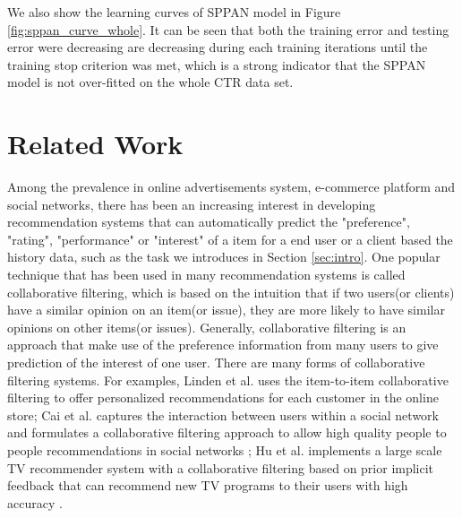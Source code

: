 \documentclass[conference,compsoc]{IEEEtran}
\begin{document}
We also show the learning curves of SPPAN model in Figure \ref{fig:sppan_curve_whole}. It can be seen that both the training error and testing error were decreasing are decreasing during each training iterations until the training stop criterion was met, which is a strong indicator that the SPPAN model is not over-fitted on the whole CTR data set.

%
\section{Related Work}
\label{sec:related}
Among the prevalence in online advertisements system, e-commerce platform and social networks, there has been an increasing interest in developing recommendation systems \cite{resnick1997recommender, ricci2011recommender} that can automatically predict the "preference", "rating", "performance" or "interest" of a item for a end user or a client based the history data, such as the task we introduces in Section \ref{sec:intro}. One popular technique that has been used in many recommendation systems is called collaborative filtering, which is based on the intuition that if two users(or clients) have a similar opinion on an item(or issue), they are more likely to have similar opinions on other items(or issues)\cite{resnick1997recommender, sarwar2001item, koren2011advances, ricci2011recommender}. Generally, collaborative filtering  is an approach that make use of the preference information from many users to give prediction of the interest of one user. There are many forms of collaborative filtering systems. For examples, Linden et al. uses the item-to-item collaborative filtering to offer personalized recommendations for each customer in the online store\cite{linden2003amazon}; Cai et al. captures the interaction between users within a social network and formulates a collaborative filtering approach to allow high quality people to people recommendations in social networks \cite{cai2011collaborative}; Hu et al. implements a large scale TV recommender system with a collaborative filtering based on prior implicit feedback that can recommend new TV programs to their users with high accuracy \cite{hu:2008}.
\end{document}
